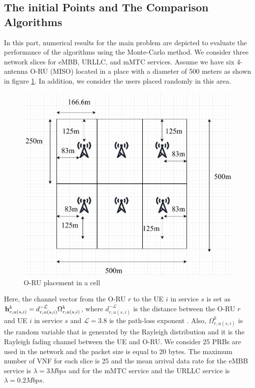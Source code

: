 \documentclass[lettersize,journal]{IEEEtran}
\begin{document}
\subsection{The initial Points and The Comparison Algorithms}
In this part, numerical results for the main problem are depicted to evaluate the performance of the algorithms using the Monte-Carlo method. We consider three network slices for eMBB, URLLC, and mMTC services.
Assume we have six 4-antenna O-RU (MISO) located in a place with a diameter of 500 meters as shown in figure \ref{fig:cell}. In addition, we consider the users placed randomly in this area.
\begin{figure}
  \centering 
    \includegraphics[scale = 0.3]{cell.pdf}
  \caption{O-RU placement in a cell}
  \label{fig:cell}
\end{figure}
Here, the channel vector from the O-RU $r$ to the UE $i$ in service $s$ is set as $\bold{h}_{r,u(s,i)}^{k}=d_{r,u(s,i)}^{-\mathcal{L}} \Omega_{r,u(s,i)}^{k} $, where $d_{r,u(s,i)}^{-\mathcal{L}} $ is the distance between the O-RU $r$ and UE $i$ in service $s$ and $\mathcal{L} = 3.8$ is the path-loss exponent \cite{gholipoor2020cloud}.
Also, $\Omega_{r,u(s,i)}^{k}$ is the random variable that is generated by the Rayleigh distribution and it is the Rayleigh fading channel between the UE and O-RU.
We consider 25 PRBs are used in the network and the packet size is equal to 20 bytes.
The maximum number of VNF for each slice is 25 and the mean arrival data rate for the eMBB service is $\lambda  = 3Mbps$ and for the mMTC service and the URLLC  service is $\lambda  = 0.2Mbps$. 
\end{document}
